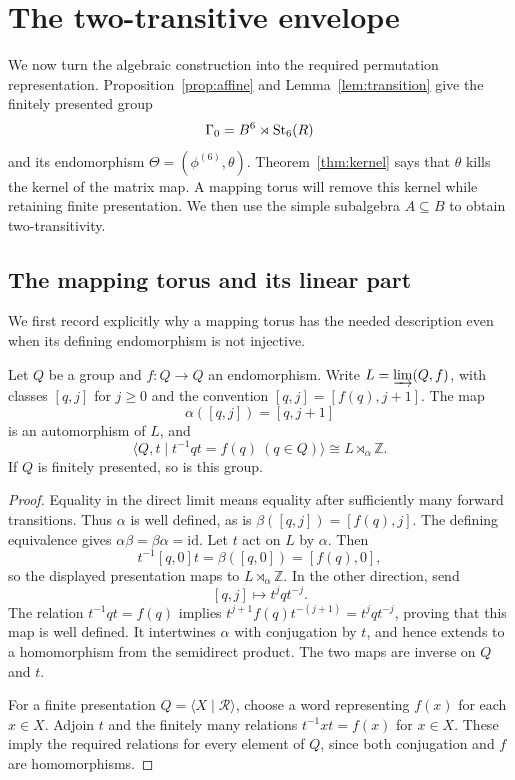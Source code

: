 \section{The two-transitive envelope}\label{sec:action}

We now turn the algebraic construction into the required permutation
representation.  Proposition~\ref{prop:affine} and
Lemma~\ref{lem:transition} give the finitely presented group
\[
 \Gamma_0=B^6\rtimes\operatorname{St}_6(R)
\]
and its endomorphism $\Theta=(\phi^{(6)},\theta)$.
Theorem~\ref{thm:kernel} says that $\theta$ kills the kernel of the matrix
map.  A mapping torus will remove this kernel while retaining finite
presentation.  We then use the simple subalgebra $A\subseteq B$ to obtain
two-transitivity.

\subsection{The mapping torus and its linear part}

We first record explicitly why a mapping torus has the needed description
even when its defining endomorphism is not injective.

\begin{lemma}\label{lem:mapping-torus}
Let $Q$ be a group and $f:Q\to Q$ an endomorphism.  Write
$L=\varinjlim(Q,f)$, with classes $[q,j]$ for $j\geq0$ and the convention
$[q,j]=[f(q),j+1]$.  The map
\[
 \alpha([q,j])=[q,j+1]
\]
is an automorphism of $L$, and
\[
 \langle Q,t\mid t^{-1}qt=f(q)\ (q\in Q)\rangle
 \cong L\rtimes_\alpha\mathbb Z.
\]
If $Q$ is finitely presented, so is this group.
\end{lemma}

\begin{proof}
Equality in the direct limit means equality after sufficiently many
forward transitions.  Thus $\alpha$ is well defined, as is
$\beta([q,j])=[f(q),j]$.  The defining equivalence gives
$\alpha\beta=\beta\alpha=\mathrm{id}$.
Let $t$ act on $L$ by $\alpha$.  Then
\[
 t^{-1}[q,0]t=\beta([q,0])=[f(q),0],
\]
so the displayed presentation maps to $L\rtimes_\alpha\mathbb Z$.
In the other direction, send
\[
 [q,j]\longmapsto t^jqt^{-j}.
\]
The relation $t^{-1}qt=f(q)$ implies
$t^{j+1}f(q)t^{-(j+1)}=t^jqt^{-j}$, proving that this map is well
defined.  It intertwines $\alpha$ with conjugation by $t$, and hence
extends to a homomorphism from the semidirect product.  The two maps are
inverse on $Q$ and $t$.

For a finite presentation $Q=\langle X\mid\mathcal R\rangle$, choose a
word representing $f(x)$ for each $x\in X$.  Adjoin $t$ and the finitely
many relations $t^{-1}xt=f(x)$ for $x\in X$.  These imply the required
relations for every element of $Q$, since both conjugation and $f$ are
homomorphisms.
\end{proof}

